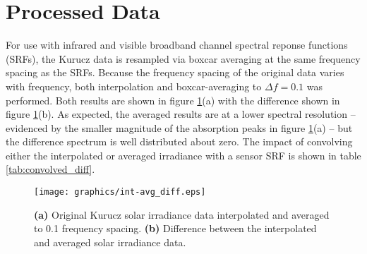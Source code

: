 \section{Processed Data}
For use with infrared and visible broadband channel spectral reponse functions (SRFs), the Kurucz data is resampled via boxcar averaging at the same frequency spacing as the SRFs. Because the frequency spacing of the original data varies with frequency, both interpolation and boxcar-averaging to $\Delta f = 0.1$\invcm{} was performed. Both results are shown in figure \ref{fig:Kurucz_int-avg}(a) with the difference shown in figure \ref{fig:Kurucz_int-avg}(b). As expected, the averaged results are at a lower spectral resolution -- evidenced by the smaller magnitude of the absorption peaks in figure \ref{fig:Kurucz_int-avg}(a) -- but the difference spectrum is well distributed about zero. The impact of convolving either the interpolated or averaged irradiance with a sensor SRF is shown in table \ref{tab:convolved_diff}.
\begin{figure}[htp]
  \centering
  \texttt{[image: graphics/int-avg\_diff.eps]}
  \caption{\textbf{(a)} Original Kurucz solar irradiance data interpolated and averaged to 0.1\invcm{} frequency spacing. \textbf{(b)} Difference between the interpolated and averaged solar irradiance data.}
  \label{fig:Kurucz_int-avg}
\end{figure}

